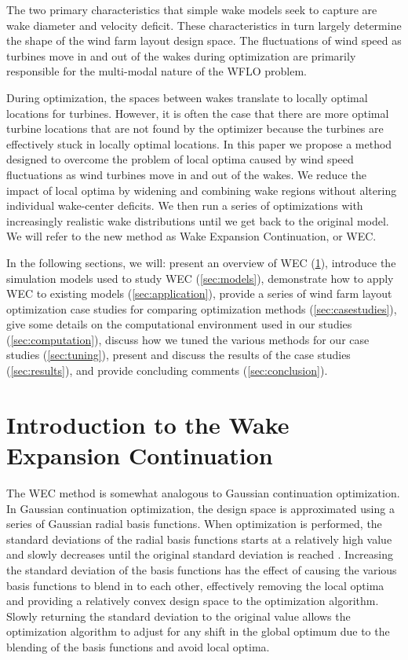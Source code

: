 \documentclass[journal abbreviation, manuscript]{copernicus}
\begin{document}
	The two primary characteristics that simple wake models seek to capture are wake diameter and velocity deficit. These characteristics in turn largely determine the shape of the wind farm layout design space. The fluctuations of wind speed as turbines move in and out of the wakes during optimization are primarily responsible for the multi-modal nature of the WFLO problem. 
	
	During optimization, the spaces between wakes translate to locally optimal locations for turbines. However, it is often the case that there are more optimal turbine locations that are not found by the optimizer because the turbines are effectively stuck in locally optimal locations. In this paper we propose a method designed to overcome the problem of local optima caused by wind speed fluctuations as wind turbines move in and out of the wakes. We reduce the impact of local optima by widening and combining wake regions without altering individual wake-center deficits. We then run a series of optimizations with increasingly realistic wake distributions until we get back to the original model. We will refer to the new method as Wake Expansion Continuation, or WEC. 
	
	In the following sections, we will: present an overview of WEC (\ref{sec:introwec}), introduce the simulation models used to study WEC (\ref{sec:models}), demonstrate how to apply WEC to existing models (\ref{sec:application}), provide a series of wind farm layout optimization case studies for comparing optimization methods (\ref{sec:casestudies}), give some details on the computational environment used in our studies (\ref{sec:computation}), discuss how we tuned the various methods for our case studies (\ref{sec:tuning}), present and discuss the results of the case studies (\ref{sec:results}), and provide concluding comments (\ref{sec:conclusion}).
	
	
	\section{Introduction to the Wake Expansion Continuation}\label{sec:introwec}
	
	The WEC method is somewhat analogous to Gaussian continuation optimization. In Gaussian continuation optimization, the design space is approximated using a series of Gaussian radial basis functions. When optimization is performed, the standard deviations of the radial basis functions starts at a relatively high value and slowly decreases until the original standard deviation is reached \cite{mobahi2015}. Increasing the standard deviation of the basis functions has the effect of causing the various basis functions to blend in to each other, effectively removing the local optima and providing a relatively convex design space to the optimization algorithm. Slowly returning the standard deviation to the original value allows the optimization algorithm to adjust for any shift in the global optimum due to the blending of the basis functions and avoid local optima. 
	
\end{document}
